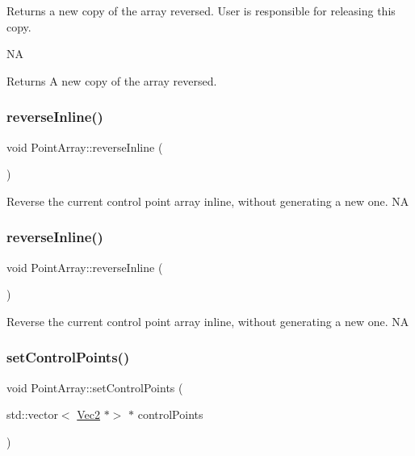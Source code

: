 Returns a new copy of the array reversed. User is responsible for releasing this copy.

NA \begin{DoxyReturn}{Returns}
A new copy of the array reversed. 
\end{DoxyReturn}
\mbox{\label{classPointArray_a0b1712afca2d1c5f912929f1fcd8eb2d}} 
\subsubsection{\texorpdfstring{reverse\+Inline()}{reverseInline()}\hspace{0.1cm}{\footnotesize\ttfamily [1/2]}}
{\footnotesize\ttfamily void Point\+Array\+::reverse\+Inline (\begin{DoxyParamCaption}{ }\end{DoxyParamCaption})}

Reverse the current control point array inline, without generating a new one.  NA \mbox{\label{classPointArray_a0b1712afca2d1c5f912929f1fcd8eb2d}} 
\subsubsection{\texorpdfstring{reverse\+Inline()}{reverseInline()}\hspace{0.1cm}{\footnotesize\ttfamily [2/2]}}
{\footnotesize\ttfamily void Point\+Array\+::reverse\+Inline (\begin{DoxyParamCaption}{ }\end{DoxyParamCaption})}

Reverse the current control point array inline, without generating a new one.  NA \mbox{\label{classPointArray_a494eaba68f33da1e1a47f0619a74a488}} 
\subsubsection{\texorpdfstring{set\+Control\+Points()}{setControlPoints()}\hspace{0.1cm}{\footnotesize\ttfamily [1/2]}}
{\footnotesize\ttfamily void Point\+Array\+::set\+Control\+Points (\begin{DoxyParamCaption}\item[{std\+::vector$<$ \hyperlink{classVec2}{Vec2} $\ast$$>$ $\ast$}]{control\+Points }\end{DoxyParamCaption})}

